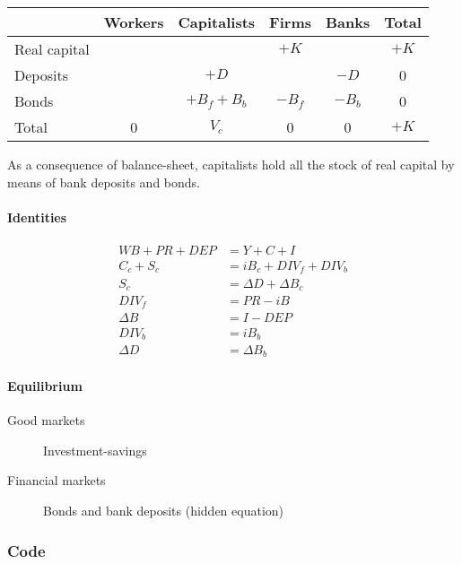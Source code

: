 \documentclass[11pt]{article}
\begin{document}
\begin{center}
\begin{tabular}{lccccc}
\hline
 & Workers & Capitalists & Firms & Banks & Total\\
\hline
Real capital &  &  & \(+K\) &  & \(+K\)\\
Deposits &  & \(+D\) &  & \(-D\) & 0\\
Bonds &  & \(+B_{f} + B_{b}\) & \(-B_{f}\) & \(-B_b\) & 0\\
\hline
Total & 0 & \(V_{c}\) & 0 & 0 & \(+K\)\\
\hline
\end{tabular}

\end{center}

As a consequence of balance-sheet, capitalists hold all the stock of real capital by means of bank deposits and bonds.

\paragraph*{Identities}
\label{sec:org17f67db}

\begin{equation*}
\begin{align*}
 WB + PR + DEP & = Y + C + I\\
 C_{c}+ S_{c} & = iB_{c} + DIV_{f} + DIV_{b}\\
S_{c} & = \Delta D + \Delta B_{c}\\
DIV_{f} & = PR - iB\\
\Delta B & = I - DEP\\
DIV_{b} & = iB_{b}\\
\Delta D & = \Delta B_{b}
\end{align*}
\end{equation*}

\paragraph*{Equilibrium}
\label{sec:org68994e4}

\begin{description}
\item[{Good markets}] Investment-savings
\item[{Financial markets}] Bonds and bank deposits (hidden equation)
\end{description}

\subsubsection*{Code}
\label{sec:orge158ee7}
\end{document}
